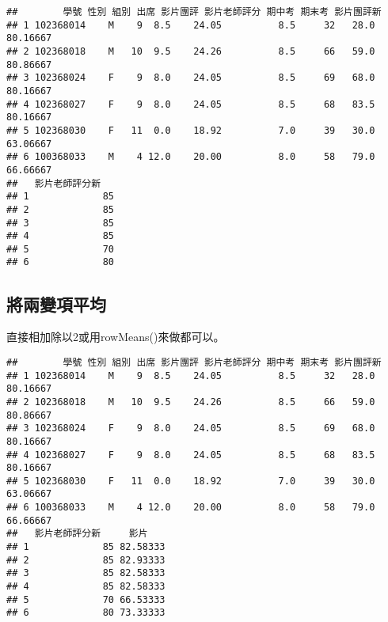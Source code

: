 \documentclass[
]{book}
\newenvironment{Shaded}{\begin{snugshade}}{\end{snugshade}}
\newcommand{\AttributeTok}[1]{\textcolor[rgb]{0.77,0.63,0.00}{#1}}
\newcommand{\ConstantTok}[1]{\textcolor[rgb]{0.00,0.00,0.00}{#1}}
\newcommand{\DecValTok}[1]{\textcolor[rgb]{0.00,0.00,0.81}{#1}}
\newcommand{\FunctionTok}[1]{\textcolor[rgb]{0.00,0.00,0.00}{#1}}
\newcommand{\NormalTok}[1]{#1}
\newcommand{\OtherTok}[1]{\textcolor[rgb]{0.56,0.35,0.01}{#1}}
\newcommand{\SpecialCharTok}[1]{\textcolor[rgb]{0.00,0.00,0.00}{#1}}
\newcommand{\StringTok}[1]{\textcolor[rgb]{0.31,0.60,0.02}{#1}}
\begin{document}
\begin{verbatim}
##        學號 性別 組別 出席 影片團評 影片老師評分 期中考 期末考 影片團評新
## 1 102368014    M    9  8.5    24.05          8.5     32   28.0   80.16667
## 2 102368018    M   10  9.5    24.26          8.5     66   59.0   80.86667
## 3 102368024    F    9  8.0    24.05          8.5     69   68.0   80.16667
## 4 102368027    F    9  8.0    24.05          8.5     68   83.5   80.16667
## 5 102368030    F   11  0.0    18.92          7.0     39   30.0   63.06667
## 6 100368033    M    4 12.0    20.00          8.0     58   79.0   66.66667
##   影片老師評分新
## 1             85
## 2             85
## 3             85
## 4             85
## 5             70
## 6             80
\end{verbatim}

\hypertarget{ux5c07ux5169ux8b8aux9805ux5e73ux5747}{%
\subsection{將兩變項平均}\label{ux5c07ux5169ux8b8aux9805ux5e73ux5747}}

直接相加除以2或用rowMeans()來做都可以。

\begin{Shaded}
\end{Shaded}

\begin{verbatim}
##        學號 性別 組別 出席 影片團評 影片老師評分 期中考 期末考 影片團評新
## 1 102368014    M    9  8.5    24.05          8.5     32   28.0   80.16667
## 2 102368018    M   10  9.5    24.26          8.5     66   59.0   80.86667
## 3 102368024    F    9  8.0    24.05          8.5     69   68.0   80.16667
## 4 102368027    F    9  8.0    24.05          8.5     68   83.5   80.16667
## 5 102368030    F   11  0.0    18.92          7.0     39   30.0   63.06667
## 6 100368033    M    4 12.0    20.00          8.0     58   79.0   66.66667
##   影片老師評分新     影片
## 1             85 82.58333
## 2             85 82.93333
## 3             85 82.58333
## 4             85 82.58333
## 5             70 66.53333
## 6             80 73.33333
\end{verbatim}
\end{document}
